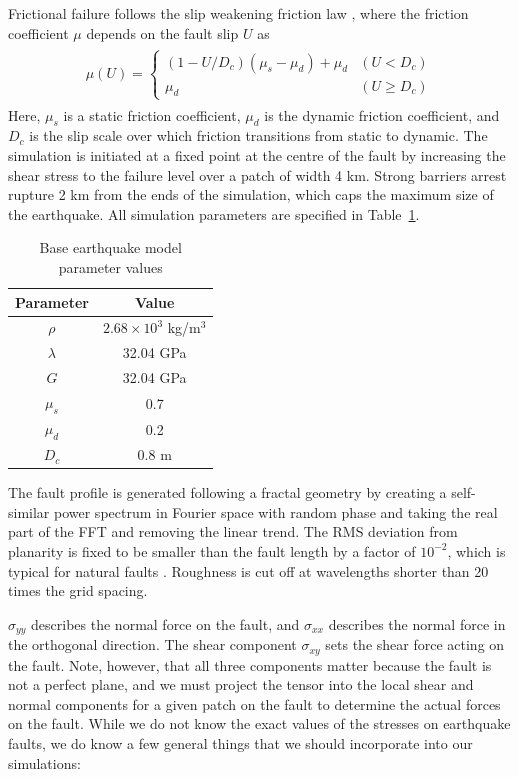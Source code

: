 \documentclass[openacc]{rstransa}%
\begin{document}
Frictional failure follows the slip weakening friction law \cite{slipweak}, where the friction coefficient $\mu$ depends
on the fault slip $U$ as
\begin{align}\label{slipweak}
\begin{split}
\mu(U) = \begin{cases}(1 - U/D_c)(\mu_s-\mu_d) + \mu_d & (U < D_c) \\ \mu_d & (U \geq D_c) \end{cases}
\end{split}
\end{align}
Here, $\mu_s$ is a static friction coefficient, $\mu_d$ is the dynamic friction coefficient, and $D_c$
is the slip scale over which friction transitions from static to dynamic. The simulation is initiated
at a fixed point at the centre of the fault by increasing the shear stress to the failure level over
a patch of width 4 km. Strong barriers arrest rupture 2 km from the ends of the simulation, which
caps the maximum size of the earthquake. All simulation parameters
are specified in Table~\ref{table_eq}.

\begin{table}[!h]
\caption{Base earthquake model parameter values}
\label{table_eq}
\begin{tabular}{cc}%
\hline
Parameter & Value \\
\hline
$\rho$ & $2.68 \times 10^3$ kg/m$^3$ \\
$\lambda$ & 32.04 GPa \\
$G$ & 32.04 GPa \\
$\mu_s$ & 0.7 \\
$\mu_d$ & 0.2 \\
$D_c$ & 0.8 m \\
\hline
\end{tabular}
\vspace*{-4pt}
\end{table}%

The fault profile is generated following a fractal geometry by creating a self-similar power spectrum in
Fourier space with random phase and taking the real part of the FFT and removing the linear trend.
The RMS deviation from planarity is fixed to be smaller than the fault length by a factor of $10^{-2}$,
which is typical
for natural faults \cite{dunhametal}. Roughness is cut off at wavelengths shorter than 20 times the
grid spacing.

$\sigma_{yy}$ describes the normal force on the fault, and $\sigma_{xx}$ describes the normal force in the orthogonal direction. The shear component $\sigma_{xy}$ sets the shear force acting on the fault. Note, however, that all three components matter because the fault is not a perfect plane, and we must project the tensor into the local shear and normal components for a given patch on the fault to determine the actual forces on the fault.
While we do not know the exact values of the stresses on earthquake faults, we do know a few general things that we should incorporate into our simulations:
\end{document}
